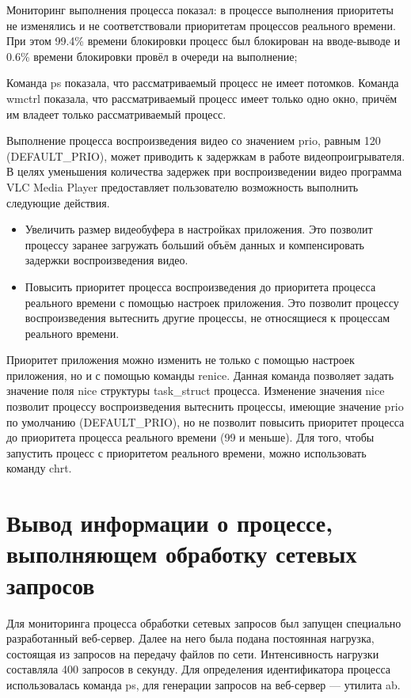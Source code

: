 Мониторинг выполнения процесса показал: в процессе выполнения приоритеты не изменялись и не соответствовали приоритетам процессов реального времени. При этом 99.4\% времени блокировки процесс был блокирован на вводе-выводе и 0.6\% времени блокировки провёл в очереди на выполнение;

Команда ps показала, что рассматриваемый процесс не имеет потомков. Команда wmctrl показала, что рассматриваемый процесс имеет только одно окно, причём им владеет только рассматриваемый процесс.

Выполнение процесса воспроизведения видео со значением prio, равным 120 (DEFAULT\_PRIO), может приводить к задержкам в работе видеопроигрывателя. В целях уменьшения количества задержек при воспроизведении видео программа VLC Media Player предоставляет пользователю возможность выполнить следующие действия. 

\begin{itemize}[label*=---]
	\item Увеличить размер видеобуфера в настройках приложения. Это позволит процессу заранее загружать больший объём данных и компенсировать задержки воспроизведения видео.
	\item Повысить приоритет процесса воспроизведения до приоритета процесса реального времени с помощью настроек приложения. Это позволит процессу воспроизведения вытеснить другие процессы, не относящиеся к процессам реального времени.
\end{itemize}

Приоритет приложения можно изменить не только с помощью настроек приложения, но и с помощью команды renice. Данная команда позволяет задать значение поля nice структуры task\_struct процесса. Изменение значения nice позволит процессу воспроизведения вытеснить процессы, имеющие значение prio по умолчанию (DEFAULT\_PRIO), но не позволит повысить приоритет процесса до приоритета процесса реального времени (99 и меньше). Для того, чтобы запустить процесс с приоритетом реального времени, можно использовать команду chrt.



\section{Вывод информации о процессе, выполняющем обработку сетевых запросов}

Для мониторинга процесса обработки сетевых запросов был запущен специально разработанный веб-сервер. Далее на него была подана постоянная нагрузка, состоящая из запросов на передачу файлов по сети. Интенсивность нагрузки составляла 400 запросов в секунду. Для определения идентификатора процесса использовалась команда ps, для генерации запросов на веб-сервер --- утилита ab.

